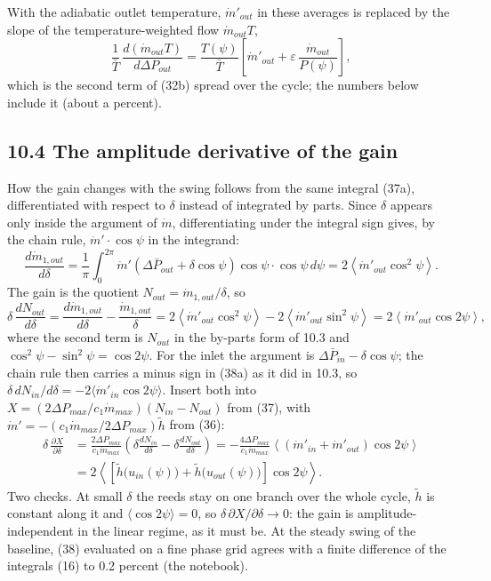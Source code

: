 \documentclass[11pt]{article}
\begin{document}
With the adiabatic outlet temperature, $\dot m'_{out}$ in these averages is replaced by the slope of the temperature-weighted flow $\dot m_{out}T$,
\[
\frac{1}{\bar T}\,\frac{d(\dot m_{out}T)}{d\Delta P_{out}} = \frac{T(\psi)}{\bar T}\left[\dot m'_{out} + \varepsilon\,\frac{\dot m_{out}}{P(\psi)}\right],
\]
which is the second term of (32b) spread over the cycle; the numbers below include it (about a percent).

\subsection*{10.4 The amplitude derivative of the gain}

How the gain changes with the swing follows from the same integral (37a), differentiated with respect to $\delta$ instead of integrated by parts. Since $\delta$ appears only inside the argument of $\dot m$, differentiating under the integral sign gives, by the chain rule, $\dot m'\cdot\cos\psi$ in the integrand:
\begin{equation}
\frac{d\dot m_{1,out}}{d\delta} = \frac{1}{\pi}\int_0^{2\pi}\dot m'\left(\Delta\bar P_{out} + \delta\cos\psi\right)\cos\psi\cdot\cos\psi\,d\psi = 2\left\langle\dot m'_{out}\cos^2\psi\right\rangle . \tag{38a}
\end{equation}
The gain is the quotient $N_{out} = \dot m_{1,out}/\delta$, so
\begin{equation}
\delta\,\frac{dN_{out}}{d\delta} = \frac{d\dot m_{1,out}}{d\delta} - \frac{\dot m_{1,out}}{\delta} = 2\left\langle\dot m'_{out}\cos^2\psi\right\rangle - 2\left\langle\dot m'_{out}\sin^2\psi\right\rangle = 2\left\langle\dot m'_{out}\cos 2\psi\right\rangle , \tag{38b}
\end{equation}
where the second term is $N_{out}$ in the by-parts form of 10.3 and $\cos^2\psi - \sin^2\psi = \cos 2\psi$. For the inlet the argument is $\Delta\bar P_{in} - \delta\cos\psi$; the chain rule then carries a minus sign in (38a) as it did in 10.3, so $\delta\,dN_{in}/d\delta = -2\langle\dot m'_{in}\cos 2\psi\rangle$. Insert both into $X = (2\Delta P_{max}/c_1\dot m_{max})(N_{in} - N_{out})$ from (37), with $\dot m' = -(c_1\dot m_{max}/2\Delta P_{max})\tilde h$ from (36):
\begin{equation}
\begin{aligned}
\delta\,\frac{\partial X}{\partial\delta} &= \frac{2\Delta P_{max}}{c_1\dot m_{max}}\left(\delta\frac{dN_{in}}{d\delta} - \delta\frac{dN_{out}}{d\delta}\right)
= -\frac{4\Delta P_{max}}{c_1\dot m_{max}}\left\langle\left(\dot m'_{in} + \dot m'_{out}\right)\cos 2\psi\right\rangle \\
&= 2\left\langle\left[\tilde h\big(u_{in}(\psi)\big) + \tilde h\big(u_{out}(\psi)\big)\right]\cos 2\psi\right\rangle .
\end{aligned} \tag{38}
\end{equation}
Two checks. At small $\delta$ the reeds stay on one branch over the whole cycle, $\tilde h$ is constant along it and $\langle\cos 2\psi\rangle = 0$, so $\delta\,\partial X/\partial\delta \to 0$: the gain is amplitude-independent in the linear regime, as it must be. At the steady swing of the baseline, (38) evaluated on a fine phase grid agrees with a finite difference of the integrals (16) to 0.2 percent (the notebook).
\end{document}
